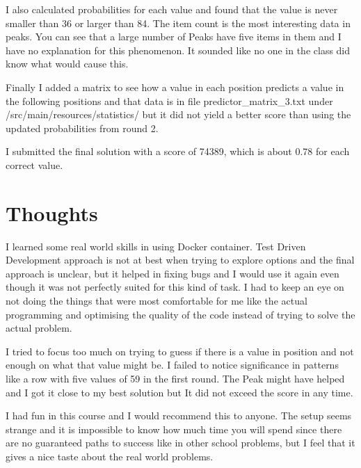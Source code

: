 \documentclass[english,12pt]{tktltiki2}
\theoremstyle{definition}
\theoremstyle{remark}
\begin{document}
I also calculated probabilities for each value and found that the value is never smaller than 36 or larger than 84. The item count is the most interesting data in peaks. You can see that a large number of Peaks have five items in them and I have no explanation for this phenomenon. It sounded like no one in the class did know what would cause this. 

Finally I added a matrix to see how a value in each position predicts a value in the following positions and that data is in file predictor\_matrix\_3.txt under /src/main/resources/statistics/ but it did not yield a better score than using the updated probabilities from round 2. 

I submitted the final solution with a score of \num{74389}, which is about 0.78 for each correct value.


\section{Thoughts}

I learned some real world skills in using Docker container. Test Driven Development approach is not at best when trying to explore options and the final approach is unclear,  but it helped in fixing bugs and I would use it again even though it was not perfectly suited for this kind of task. I had to keep an eye on not doing the things that were most comfortable for me like the actual programming and optimising the quality of the code instead of trying to solve the actual problem.

I tried to focus too much on trying to guess if there is a value in position and not enough on what that value might be. I failed to notice significance in patterns like a row with five values of 59 in the first round. The Peak might have helped and I got it close to my best solution but It did not exceed the score in any time.

I had fun in this course and I would recommend this to anyone. The setup seems strange and it is impossible to know how much time you will spend since there are no guaranteed paths to success like in other school problems, but I feel that it gives a nice taste about the real world problems.
\end{document}
